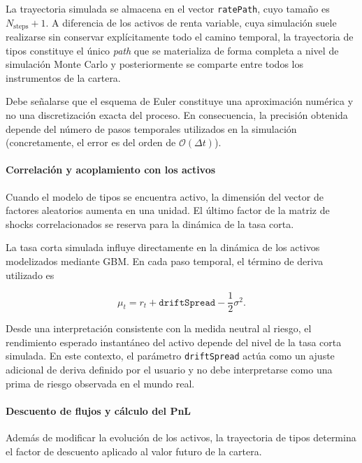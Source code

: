 \documentclass[11pt]{article}
\begin{document}
La trayectoria simulada se almacena en el vector \texttt{ratePath}, cuyo tamaño es $N_{\mathrm{steps}}+1$. A diferencia de los activos de renta variable, cuya simulación suele realizarse sin conservar explícitamente todo el camino temporal, la trayectoria de tipos constituye el único \emph{path} que se materializa de forma completa a nivel de simulación Monte Carlo y posteriormente se comparte entre todos los instrumentos de la cartera.

Debe señalarse que el esquema de Euler constituye una aproximación numérica y no una discretización exacta del proceso. En consecuencia, la precisión obtenida depende del número de pasos temporales utilizados en la simulación (concretamente, el error es del orden de $\mathcal{O}(\Delta t)$).

\paragraph{Correlación y acoplamiento con los activos}

Cuando el modelo de tipos se encuentra activo, la dimensión del vector de factores aleatorios aumenta en una unidad. El último factor de la matriz de shocks correlacionados se reserva para la dinámica de la tasa corta.

La tasa corta simulada influye directamente en la dinámica de los activos modelizados mediante GBM. En cada paso temporal, el término de deriva utilizado es

\begin{equation}
\mu_t=
r_t
+
\texttt{driftSpread}-
\frac{1}{2}\sigma^2.
\label{eq:equity_drift_hw}
\end{equation}

Desde una interpretación consistente con la medida neutral al riesgo, el rendimiento esperado instantáneo del activo depende del nivel de la tasa corta simulada. En este contexto, el parámetro \texttt{driftSpread} actúa como un ajuste adicional de deriva definido por el usuario y no debe interpretarse como una prima de riesgo observada en el mundo real.

\paragraph{Descuento de flujos y cálculo del PnL}

Además de modificar la evolución de los activos, la trayectoria de tipos determina el factor de descuento aplicado al valor futuro de la cartera.
\end{document}

